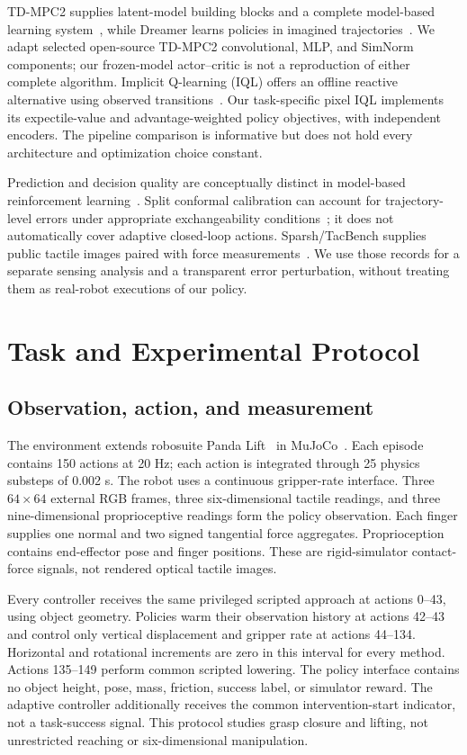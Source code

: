 \documentclass[letterpaper,10pt,conference]{ieeeconf}
\begin{document}
TD-MPC2 supplies latent-model building blocks and a complete model-based
learning system~\cite{tdmpc2}, while Dreamer learns policies in imagined
trajectories~\cite{dreamer}. We adapt selected open-source TD-MPC2 convolutional,
MLP, and SimNorm components; our frozen-model actor--critic is not a
reproduction of either complete algorithm. Implicit Q-learning (IQL) offers
an offline reactive alternative using observed transitions~\cite{iql}.
Our task-specific pixel IQL implements its expectile-value and
advantage-weighted policy objectives, with independent encoders. The
pipeline comparison is informative but does not hold every architecture and
optimization choice constant.

Prediction and decision quality are conceptually distinct in model-based
reinforcement learning~\cite{valueequivalence}. Split conformal calibration
can account for trajectory-level errors under appropriate exchangeability
conditions~\cite{conformal}; it does not automatically cover adaptive
closed-loop actions. Sparsh/TacBench supplies public tactile images paired
with force measurements~\cite{sparsh}. We use those records for a separate
sensing analysis and a transparent error perturbation, without treating them
as real-robot executions of our policy.

\section{Task and Experimental Protocol}
\subsection{Observation, action, and measurement}
The environment extends robosuite Panda Lift~\cite{robosuite} in
MuJoCo~\cite{mujoco}. Each episode contains 150 actions at 20 Hz; each action
is integrated through 25 physics substeps of 0.002 s. The robot uses a
continuous gripper-rate interface. Three $64\times64$ external RGB frames,
three six-dimensional tactile readings, and three nine-dimensional
proprioceptive readings form the policy observation. Each finger supplies
one normal and two signed tangential force aggregates. Proprioception
contains end-effector pose and finger positions. These are rigid-simulator
contact-force signals, not rendered optical tactile images.

Every controller receives the same privileged scripted approach at actions
0--43, using object geometry. Policies warm their observation history at
actions 42--43 and control only vertical displacement and gripper rate at
actions 44--134. Horizontal and rotational increments are zero in this
interval for every method. Actions 135--149 perform common scripted lowering.
The policy interface contains no object height, pose, mass, friction,
success label, or simulator reward. The adaptive controller additionally
receives the common intervention-start indicator, not a task-success signal.
This protocol studies grasp closure and lifting, not unrestricted reaching
or six-dimensional manipulation.
\end{document}
